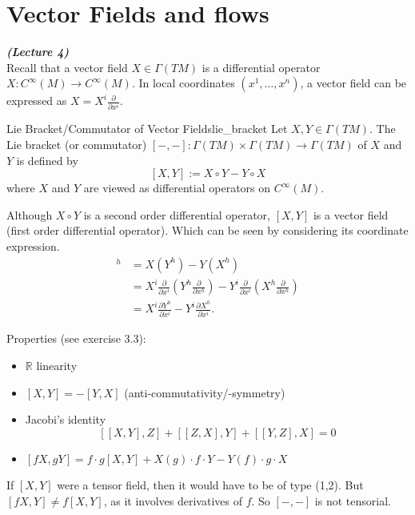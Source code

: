 
\newpage
\section{Vector Fields and flows}

\vspace{0.4cm}\emph{\textbf{(Lecture 4)}}\\


Recall that a vector field $X\in \Gamma(TM)$ is a differential operator $X: C^\infty(M) \to C^\infty(M)$. In local coordinates $(x^1, \dots, x^n)$, a vector field can be expressed as $X = X^i \frac{\partial}{\partial x^i}$.

\begin{colordef}{Lie Bracket/Commutator of Vector Fields}{lie_bracket}
Let $X, Y \in \Gamma(TM)$. The Lie bracket (or commutator) $[-,-] : \Gamma(TM) \times \Gamma(TM) \to \Gamma(TM)$ of $X$ and $Y$ is defined by
\[
[X, Y] := X \circ Y - Y \circ X
\]
where $X$ and $Y$ are viewed as differential operators on $C^\infty(M)$.
\end{colordef}

Although $X \circ Y$ is a second order differential operator, $[X, Y]$ is a vector field (first order differential operator). Which can be seen by considering its coordinate expression.
\begin{align*}
    [X, Y]^h &= X(Y^h) - Y(X^h) \\
&= X^i \frac{\partial}{\partial x^i} (Y^h \frac{\partial}{\partial x^h}) - Y^i \frac{\partial}{\partial x^i} (X^h \frac{\partial}{\partial x^h}) \\
&= X^i \frac{\partial Y^h}{\partial x^i} - Y^i \frac{\partial X^h}{\partial x^i}.
\end{align*}

\begin{colremark}
Properties (see exercise 3.3):
\begin{itemize}
    \item $\mathbb{R}$ linearity
    \item $[X, Y] = -[Y, X]$ (anti-commutativity/-symmetry)
    \item Jacobi's identity
    \[
    [[X, Y], Z] + [[Z, X], Y] + [[Y, Z], X] = 0
    \]
    \item $[f X, g Y] = f \cdot g [X, Y] + X(g) \cdot f \cdot Y - Y(f) \cdot g \cdot X$
\end{itemize}
\end{colremark}

If $[X, Y]$ were a tensor field, then it would have to be of type (1,2). But $[fX,Y]\neq f[X,Y]$, as it involves derivatives of $f$. So $[-,-]$ is not tensorial.\\

